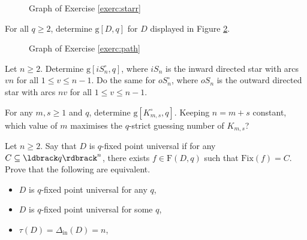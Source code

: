 \documentclass[a4paper, 11pt]{book}
\numberwithin{equation}{section}
\theoremstyle{plain}
\newcommand{\loopfull}[1]{{#1^\circ}}
\newcommand{\dMax}{\Delta}
\newcommand{\inn}[1]{#1_\mathrm{in}}
\newcommand{\dInMax}{\inn{\dMax}}
\newcommand{\feedback}{\tau}
\newcommand{\functions}{\mathrm{F}}
\newcommand{\Fix}{\mathrm{Fix}}
\newcommand{\guessing}{\mathrm{g}}
\renewcommand{\(}{\ldbrack}
\renewcommand{\)}{\rdbrack}
\begin{document}
\begin{exercises}
\begin{figure}[!htp]
\caption{Graph of Exercise \ref{exerc:starr}} \label{fig:starr}
\end{figure}


\item \label{exerc:path} For all $q \ge 2$, determine $\guessing[D,q]$ for $D$ displayed in Figure \ref{fig:path_with_legs}.

\begin{figure}[!htp]
\centering
{}
\caption{Graph of Exercise \ref{exerc:path}} \label{fig:path_with_legs}
\end{figure}


\item \label{exerc:star} Let $n \ge 2$. Determine $\guessing[\loopfull{iS_n}, q]$, where $iS_n$ is the inward directed star with arcs $vn$ for all $1 \le v \le n-1$. Do the same for $\loopfull{oS_n}$, where $oS_n$ is the outward directed star with arcs $nv$ for all $1 \le v \le n-1$.

\item For any $m,s \ge 1$ and $q$, determine $\guessing[\loopfull{K_{m,s}}, q]$. Keeping $n = m + s$ constant, which value of $m$ maximises the $q$-strict guessing number of $K_{m,s}$?


\item Let $n \ge 2$. Say that $D$ is $q$-fixed point universal if for any $C \subseteq \(q\)^n$, there exists $f \in \functions(D, q)$ such that $\Fix(f) = C$. Prove that the following are equivalent.
\begin{itemize}
	\item $D$ is $q$-fixed point universal for any $q$,  

	\item $D$ is $q$-fixed point universal for some $q$,
	
	\item $\feedback(D) = \dInMax(D) = n$,
	

\end{itemize}
\end{exercises}
\end{document}
